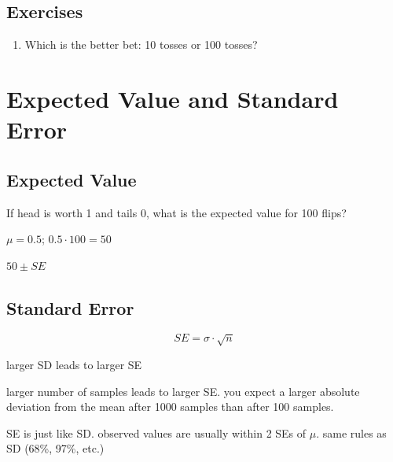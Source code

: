 \documentclass[portrait]{exam}
\begin{document}
  \subsection{Exercises}

  \begin{enumerate}
    \item Which is the better bet: 10 tosses or 100 tosses?
  \end{enumerate}

  \section{Expected Value and Standard Error}
  \subsection{Expected Value}
  If head is worth 1 and tails 0, what is the expected value for 100 flips?

  \begin{itemize*}
    \item $\mu = 0.5$; $0.5 \cdot 100 = 50$
    \item $50 \pm SE$
  \end{itemize*}

  \subsection{Standard Error}
  \[
    SE = \sigma \cdot \sqrt{n}
  \]

  \begin{itemize*}
    \item larger SD leads to larger SE
    \item larger number of samples leads to larger SE. you expect a larger
      absolute deviation from the mean after 1000 samples than after 100
      samples.
    \item SE is just like SD. observed values are usually within 2 SEs of $\mu$.
      same rules as SD (68\%, 97\%, etc.)
  \end{itemize*}
\end{document}

